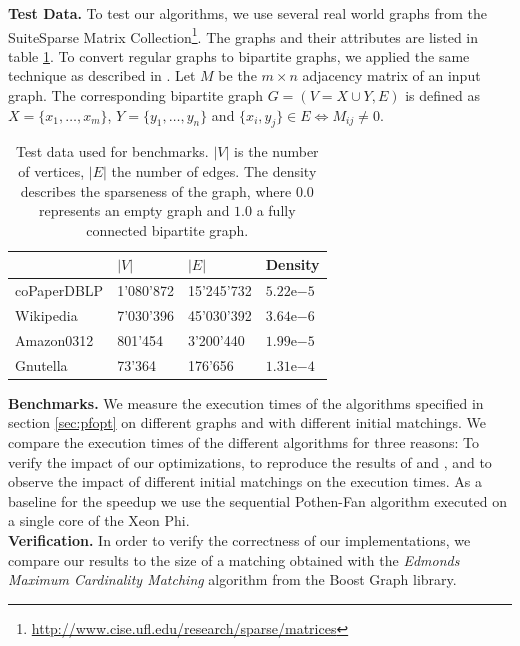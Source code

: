 \documentclass[letterpaper]{article}
\newcommand{\mypar}[1]{{\bf #1.}}
\begin{document}
\mypar{Test Data}
To test our algorithms, we use several real world graphs from the SuiteSparse Matrix Collection\footnote{\url{http://www.cise.ufl.edu/research/sparse/matrices}}.
The graphs and their attributes are listed in table \ref{table:testdata}. 
To convert regular graphs to bipartite graphs, we applied the same technique as described in \cite{Azad:2015}. 
Let $M$ be the $m \times n$ adjacency matrix of an input graph. 
The corresponding bipartite graph $G = (V = X \cup Y, E)$ is defined as $X = \{x_1, \dots, x_m\}$, $Y = \{y_1, \dots, y_n\}$ and $\{x_i, y_j\} \in E \iff M_{ij} \neq 0$.\\


\begin{table}
\centering
\begin{tabular}{ |l|l|l|l| }
\hline
 & $\lvert V \rvert$ & $\lvert E \rvert$ & Density \\ \hline
coPaperDBLP & 1'080'872 & 15'245'732 & $5.22\mathrm{e}{-5}$ \\ \hline
Wikipedia & 7'030'396 & 45'030'392 & $3.64\mathrm{e}{-6}$ \\ \hline
Amazon0312 & 801'454 & 3'200'440 & $1.99\mathrm{e}{-5}$ \\ \hline
Gnutella & 73'364 & 176'656 & $1.31\mathrm{e}{-4}$ \\ \hline
\end{tabular}
\caption{Test data used for benchmarks. $\lvert V \rvert$ is the number of vertices, $\lvert E \rvert$ the number of edges. The density describes the sparseness of the graph, where $0.0$ represents an empty graph and $1.0$ a fully connected bipartite graph.}
\label{table:testdata}
\end{table}

\mypar{Benchmarks}
We measure the execution times of the algorithms specified in section \ref{sec:pfopt} on different graphs and with different initial matchings. We compare the execution times of the different algorithms for three reasons: To verify the impact of our optimizations, to reproduce the results of \cite{Azad:2012} and \cite{Azad:2015}, and to observe the impact of different initial matchings on the execution times. As a baseline for the speedup we use the sequential Pothen-Fan algorithm executed on a single core of the Xeon Phi.\\

\mypar{Verification}
In order to verify the correctness of our implementations, we compare our results to the size of a matching obtained with the \textit{Edmonds Maximum Cardinality Matching} algorithm \cite{BoostEdmonds} from the Boost Graph library.\\
\end{document}

